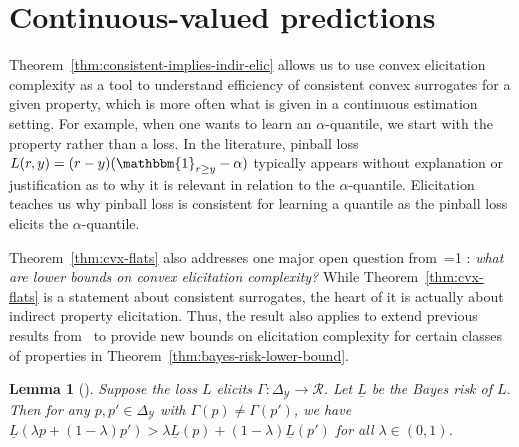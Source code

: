 \documentclass{article}
\newcommand{\Comments}{1}
\newcommand{\mynote}[2]{\ifnum\Comments=1\textcolor{#1}{#2}\fi}
\newcommand{\mytodo}[2]{\ifnum\Comments=1%
	\todo[linecolor=#1!80!black,backgroundcolor=#1,bordercolor=#1!80!black]{#2}\fi}
\newcommand{\raf}[1]{\mynote{green!80!blue}{[RF: #1]}}
\newcommand{\jessiet}[1]{\mytodo{purple!20!white}{JF: #1}}
\newcommand{\reals}{\mathbb{R}}
\newcommand{\simplex}{\Delta_\Y}
\newcommand{\affhull}{\mathrm{affhull}}
\newcommand{\R}{\mathcal{R}}
\newcommand{\Y}{\mathcal{Y}}
\newcommand{\ones}{\mathbbm{1}}
\newtheorem{lemma}{Lemma}
\begin{document}
\section{Continuous-valued predictions}\label{sec:contin-consis}


Theorem~\ref{thm:consistent-implies-indir-elic} allows us to use convex elicitation complexity as a tool to understand efficiency of consistent convex surrogates for a given property, which is more often what is given in a continuous estimation setting.
For example, when one wants to learn an $\alpha$-quantile, we start with the property rather than a loss.
In the literature, pinball loss $L(r,y) = (r-y)(\ones_{r \geq y} - \alpha)$ typically appears without explanation or justification as to why it is relevant in relation to the $\alpha$-quantile.
Elicitation teaches us why pinball loss is consistent for learning a quantile as the pinball loss elicits the $\alpha$-quantile.


Theorem~\ref{thm:cvx-flats} also addresses one major open question from~\cite{frongillo2015elicitation,frongillo2018elicitation}\jessiet{which citation?}: \emph{what are lower bounds on convex elicitation complexity?}
While Theorem~\ref{thm:cvx-flats} is a statement about consistent surrogates, the heart of it is actually about indirect property elicitation.
Thus, the result also applies to extend previous results from~\cite{frongillo2015elicitation,frongillo2018elicitation} to provide new bounds on elicitation complexity for certain classes of properties in Theorem~\ref{thm:bayes-risk-lower-bound}.

\newcommand{\lbar}{\underline{L}} %
\newcommand{\iden}{\mathrm{iden}}
\newcommand{\Var}{\mathrm{Var}}

\begin{lemma}[\cite{frongillo2018elicitation}]
  \label{lem:elic-complex-bayes-concave}
  Suppose the loss $L$ elicits $\Gamma:\simplex\to\R$.
  Let $\lbar$ be the Bayes risk of $L$.
  Then for any $p,p'\in\simplex$ with $\Gamma(p)\neq\Gamma(p')$, we have $\lbar(\lambda p + (1-\lambda) p') > \lambda \lbar(p) + (1-\lambda) \lbar(p')$ for all $\lambda\in(0,1)$.
\end{lemma}

\end{document}
